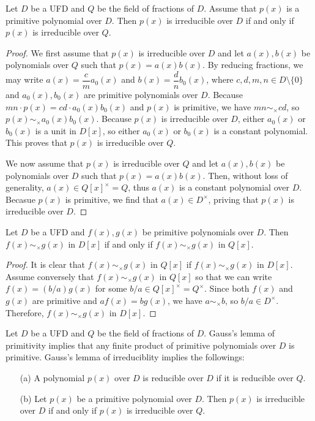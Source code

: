\begin{thm}
    Let $D$ be a UFD and $Q$ be the field of fractions of $D$.
    Assume that $p(x)$ is a primitive polynomial over $D$.
    Then $p(x)$ is irreducible over $D$ if and only if $p(x)$ is irreducible over $Q$.
\end{thm}
\begin{proof}
    We first assume that $p(x)$ is irreducible over $D$ and let $a(x), b(x)$ be polynomials over $Q$ such that $p(x)=a(x)b(x)$.
    By reducing fractions, we may write $a(x)=\dfrac{c}{m}a_0(x)$ and $b(x)=\dfrac{d}{n}b_0(x)$, where $c, d, m, n\in D\setminus\{0\}$ and $a_0(x), b_0(x)$ are primitive polynomials over $D$.
    Because $mn\cdot p(x)=cd\cdot a_0(x)b_0(x)$ and $p(x)$ is primitive, we have $mn\sim_\times cd$, so $p(x)\sim_\times a_0(x)b_0(x)$.
    Because $p(x)$ is irreducible over $D$, either $a_0(x)$ or $b_0(x)$ is a unit in $D[x]$, so either $a_0(x)$ or $b_0(x)$ is a constant polynomial.
    This proves that $p(x)$ is irreducible over $Q$.

    We now assume that $p(x)$ is irreducible over $Q$ and let $a(x), b(x)$ be polynomials over $D$ such that $p(x)=a(x)b(x)$.
    Then, without loss of generality, $a(x)\in Q[x]^\times=Q$, thus $a(x)$ is a constant polynomial over $D$.
    Becasue $p(x)$ is primitive, we find that $a(x)\in D^\times$, priving that $p(x)$ is irreducible over $D$.
\end{proof}

\begin{cor}
    Let $D$ be a UFD and $f(x), g(x)$ be primitive polynomials over $D$.
    Then $f(x)\sim_\times g(x)$ in $D[x]$ if and only if $f(x)\sim_\times g(x)$ in $Q[x]$.
\end{cor}
\begin{proof}
    It is clear that $f(x)\sim_\times g(x)$ in $Q[x]$ if $f(x)\sim_\times g(x)$ in $D[x]$.
    Assume conversely that $f(x)\sim_\times g(x)$ in $Q[x]$ so that we can write $f(x)=(b/a)g(x)$ for some $b/a\in Q[x]^\times=Q^\times$.
    Since both $f(x)$ and $g(x)$ are primitive and $af(x)=bg(x)$, we have $a\sim_\times b$, so $b/a\in D^\times$.
    Therefore, $f(x)\sim_\times g(x)$ in $D[x]$.
\end{proof}

\begin{rmk}
    Let $D$ be a UFD and $Q$ be the field of fractions of $D$.
    Gauss's lemma of primitivity implies that any finite product of primitive polynomials over $D$ is primitive.
    Gauss's lemma of irreduciblity implies the followings:
    \begin{enumerate}
        \item[(a)]
        {
            A polynomial $p(x)$ over $D$ is reducible over $D$ if it is reducible over $Q$.
        }
        \item[(b)]
        {
            Let $p(x)$ be a primitive polynomial over $D$.
            Then $p(x)$ is irreducible over $D$ if and only if $p(x)$ is irreducible over $Q$.
        }
    \end{enumerate}
\end{rmk}

